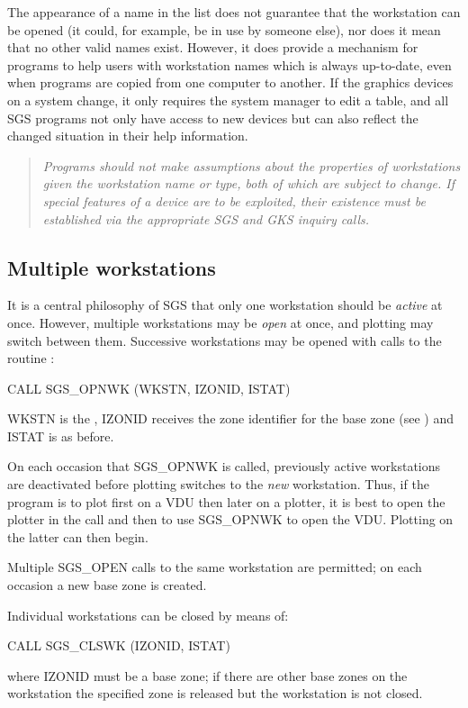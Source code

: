 \documentclass[11pt]{starlink}
\begin{document}
The appearance of a name in the list does not guarantee that the workstation can
be opened (it could, for example, be in use by someone else), nor does it mean
that no other valid names exist.
However, it does provide a mechanism for programs to help users with
workstation names which is always up-to-date, even when programs are copied
from one computer to another.
If the graphics devices on a system change, it only requires the system manager
to edit a table, and all SGS programs not only have access to new
devices but can also reflect the changed situation in their help information.

\begin{quote}
\emph{Programs should not make assumptions about the properties
of workstations given the workstation name or type, both of which are subject
to change.  If special features of a device are to be exploited, their
existence must be established via the appropriate SGS and GKS inquiry calls.}
\end{quote}

\subsection {Multiple workstations}\label{sec-mult-ws}

It is a central philosophy of SGS that only one workstation should be
\emph{active}\/ at once.
However, multiple workstations may be \emph{open}\/ at once, and plotting may
switch between them.
Successive workstations may be opened with calls to the routine
:
\begin{terminalv}
CALL SGS_OPNWK (WKSTN, IZONID, ISTAT)
\end{terminalv}
WKSTN is the
, IZONID receives the zone
identifier for the base zone (see
) and ISTAT is as before.

On each occasion that SGS\_OPNWK is called, previously
active workstations are deactivated before plotting switches
to the \emph{new}\/ workstation.  Thus, if the program is to plot
first on a VDU then later on a plotter, it is best to open the
plotter in the 
call and then to use SGS\_OPNWK to open
the VDU.  Plotting on the latter can then begin.

Multiple SGS\_OPEN calls to the same workstation are permitted;  on
each occasion a new base zone is created.

Individual workstations can be closed by means of:
\begin{terminalv}
CALL SGS_CLSWK (IZONID, ISTAT)
\end{terminalv}
where IZONID must be a base zone; if there are other base zones on the
workstation the specified zone is released but the workstation is not closed.
\end{document}
